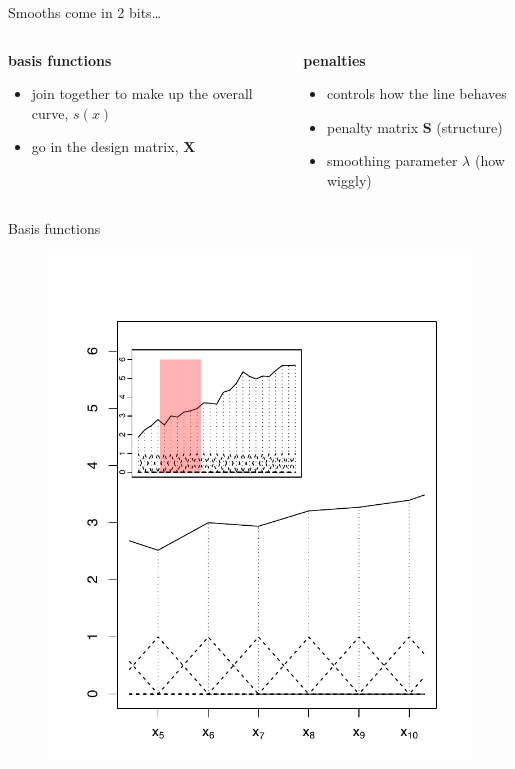 \documentclass{beamer}
\begin{document}
\begin{frame}{Smooths come in 2 bits\ldots}
  \begin{columns}[T]
    \begin{column}{0.40\textwidth}
      \textbf{basis functions}
      \begin{itemize}
        \item join together to make up the overall curve, $s(x)$
        \item go in the design matrix, $\textbf{X}$
      \end{itemize}
    \end{column}
    \begin{column}{0.58\textwidth}
      \textbf{penalties}
      \begin{itemize}
        \item controls how the line behaves
        \item penalty matrix $\textbf{S}$ (structure)
        \item smoothing parameter $\lambda$ (how wiggly)
      \end{itemize}
    \end{column}
  \end{columns}
\end{frame}

\begin{frame}{Basis functions}
  \begin{figure}[h]
    \begin{center}
      \includegraphics[height=0.9\textheight]{figures/fem.pdf}
    \end{center}
  \end{figure}
\end{frame}
\end{document}
